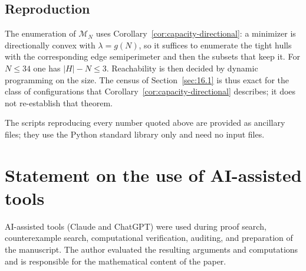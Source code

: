 \documentclass[11pt]{article}
\theoremstyle{plain}
\theoremstyle{definition}
\theoremstyle{remark}
\begin{document}
\subsection{Reproduction}\label{sec:16.4}

The enumeration of \(\mathcal{M}_{N}\) uses Corollary~\ref{cor:capacity-directional}: a minimizer is
directionally convex with \(\lambda=g(N)\), so it suffices to enumerate the tight hulls with
the corresponding edge semiperimeter and then the subsets that keep it. For \(N\le34\) one
has \(|H|-N\le3\). Reachability is then decided by dynamic programming on the size. The
census of Section~\ref{sec:16.1} is thus exact for the class of configurations that
Corollary~\ref{cor:capacity-directional} describes; it does not re-establish that theorem.

The scripts reproducing every number quoted above are provided as ancillary files; they use
the Python standard library only and need no input files.



\section*{Statement on the use of AI-assisted tools}

AI-assisted tools (Claude and ChatGPT) were used during proof search, counterexample search,
computational verification, auditing, and preparation of the manuscript. The author evaluated
the resulting arguments and computations and is responsible for the mathematical content of the
paper.



\end{document}
